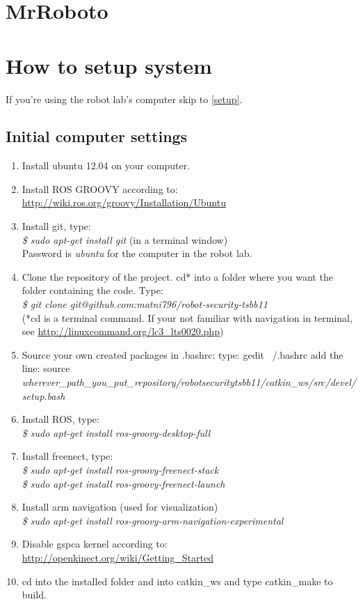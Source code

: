 \documentclass[10pt,a4paper]{article}
\begin{document}
\section*{MrRoboto}

\section{How to setup system}
If you're using the robot lab's computer skip to \ref{setup}.
\subsection{Initial computer settings}

\begin{enumerate}
\item Install ubuntu 12.04 on your computer.
\item Install ROS GROOVY according to: \url{http://wiki.ros.org/groovy/Installation/Ubuntu}
\item Install git, type:\\
\textit{
\$ sudo apt-get install git} (in a terminal window)\\
Password is \textit{ubuntu} for the computer in the robot lab.
\item Clone the repository of the project.
cd* into a folder where you want the folder containing the code.
Type:\\
\textit{\$ git clone git@github.com:matni796/robot-security-tsbb11}\\
(*cd is a terminal command. If your not familiar with navigation in terminal, see \url{http://linuxcommand.org/lc3\_lts0020.php})

\item Source your own created packages in .bashrc:
	type: gedit ~/.bashrc
add the line:
source \textit{wherever\_path\_you\_put\_repository/robot\-security\-tsbb11/catkin\_ws/src/devel/setup.bash}

\item Install ROS, type: \\
\textit{\$ sudo apt-get install ros-groovy-desktop-full}

\item Install freenect, type: \\
\textit{
\$ sudo apt-get install ros-groovy-freenect-stack\\
\$ sudo apt-get install ros-groovy-freenect-launch
}

\item Install arm navigation (used for visualization)\\
\textit{\$ sudo apt-get install ros-groovy-arm-navigation-experimental}

\item Disable gspca kernel according to:
	\url{http://openkinect.org/wiki/Getting\_Started}


\item cd into the installed folder and into catkin\_ws and type catkin\_make to build.
\end{enumerate}
\end{document}

